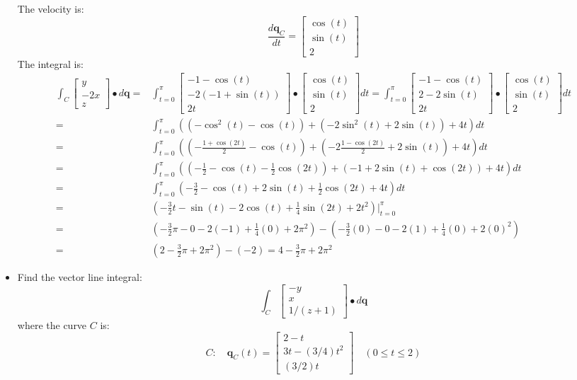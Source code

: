 \documentclass{article}
\begin{document}
\begin{itemize}
The velocity is:
\[\frac{d\mathbf{q}_C}{dt} = \begin{bmatrix} 
\cos(t) \\ \sin(t) \\ 2  
\end{bmatrix}\]
The integral is:
\begin{align*}
\int_C \begin{bmatrix} y \\ -2x \\ z \end{bmatrix} \bullet d\mathbf{q} 
= & \int_{t=0}^{\pi} \begin{bmatrix} -1 - \cos(t) \\ -2(-1 + \sin(t)) \\ 2t \end{bmatrix} \bullet \begin{bmatrix} 
\cos(t) \\ \sin(t) \\ 2  
\end{bmatrix}dt
= \int_{t=0}^{\pi} \begin{bmatrix} -1 - \cos(t) \\ 2 - 2\sin(t) \\ 2t \end{bmatrix} \bullet \begin{bmatrix} 
\cos(t) \\ \sin(t) \\ 2  
\end{bmatrix}dt \\ 
= & \int_{t=0}^{\pi} ((-\cos^2(t) - \cos(t)) + (-2\sin^2(t) + 2\sin(t)) + 4t)dt \\ 
= & \int_{t=0}^{\pi} ((-\frac{1 + \cos(2t)}{2} - \cos(t)) + (-2\frac{1 - \cos(2t)}{2} + 2\sin(t)) + 4t)dt \\ 
= & \int_{t=0}^{\pi} ((-\frac{1}{2} - \cos(t) - \frac{1}{2}\cos(2t)) + (-1 + 2\sin(t) + \cos(2t)) + 4t)dt \\ 
= & \int_{t=0}^{\pi} (-\frac{3}{2} - \cos(t) + 2\sin(t) + \frac{1}{2}\cos(2t) + 4t)dt \\ 
= & (-\frac{3}{2}t - \sin(t) - 2\cos(t) + \frac{1}{4}\sin(2t) + 2t^2)\bigg|_{t=0}^{\pi} \\
= & (-\frac{3}{2}\pi - 0 - 2(-1) + \frac{1}{4}(0) + 2\pi^2) - (-\frac{3}{2}(0) - 0 - 2(1) + \frac{1}{4}(0) + 2(0)^2) \\
= & (2 - \frac{3}{2}\pi + 2\pi^2) - (-2) 
= 4 - \frac{3}{2}\pi + 2\pi^2
\end{align*}

\item 
Find the vector line integral: 
\[\int_C \begin{bmatrix} -y \\ x \\ 1/(z + 1) \end{bmatrix} \bullet d\mathbf{q}\]
where the curve \(C\) is:
\[C : \quad 
\mathbf{q}_C(t) = \begin{bmatrix} 
2 - t \\ 3t - (3/4)t^2 \\ (3/2)t  
\end{bmatrix} \quad 
(0 \leq t \leq 2)\] 


\end{itemize}
\end{document}
